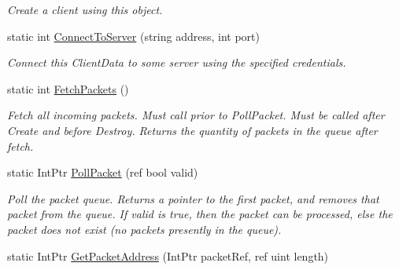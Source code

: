 \begin{DoxyCompactItemize}
\begin{DoxyCompactList}\small\item\em Create a client using this object. \end{DoxyCompactList}\item 
\hypertarget{class_champ_net_plugin_1_1_network_plugin_a1f89494dbb077c0f5ae9d7564caf7b05}{static int \hyperlink{class_champ_net_plugin_1_1_network_plugin_a1f89494dbb077c0f5ae9d7564caf7b05}{Connect\-To\-Server} (string address, int port)}\label{class_champ_net_plugin_1_1_network_plugin_a1f89494dbb077c0f5ae9d7564caf7b05}

\begin{DoxyCompactList}\small\item\em Connect this Client\-Data to some server using the specified credentials. \end{DoxyCompactList}\item 
\hypertarget{class_champ_net_plugin_1_1_network_plugin_a00b84d962f0265cd73fcf5e735357ac7}{static int \hyperlink{class_champ_net_plugin_1_1_network_plugin_a00b84d962f0265cd73fcf5e735357ac7}{Fetch\-Packets} ()}\label{class_champ_net_plugin_1_1_network_plugin_a00b84d962f0265cd73fcf5e735357ac7}

\begin{DoxyCompactList}\small\item\em Fetch all incoming packets. Must call prior to Poll\-Packet. Must be called after Create and before Destroy. Returns the quantity of packets in the queue after fetch. \end{DoxyCompactList}\item 
\hypertarget{class_champ_net_plugin_1_1_network_plugin_a0a86f5783bdc9f940c516429fafd83c7}{static Int\-Ptr \hyperlink{class_champ_net_plugin_1_1_network_plugin_a0a86f5783bdc9f940c516429fafd83c7}{Poll\-Packet} (ref bool valid)}\label{class_champ_net_plugin_1_1_network_plugin_a0a86f5783bdc9f940c516429fafd83c7}

\begin{DoxyCompactList}\small\item\em Poll the packet queue. Returns a pointer to the first packet, and removes that packet from the queue. If valid is true, then the packet can be processed, else the packet does not exist (no packets presently in the queue). \end{DoxyCompactList}\item 
\hypertarget{class_champ_net_plugin_1_1_network_plugin_ab5f62d68a1e0b9c6a88c753616e38b5c}{static Int\-Ptr \hyperlink{class_champ_net_plugin_1_1_network_plugin_ab5f62d68a1e0b9c6a88c753616e38b5c}{Get\-Packet\-Address} (Int\-Ptr packet\-Ref, ref uint length)}\label{class_champ_net_plugin_1_1_network_plugin_ab5f62d68a1e0b9c6a88c753616e38b5c}


\end{DoxyCompactItemize}
